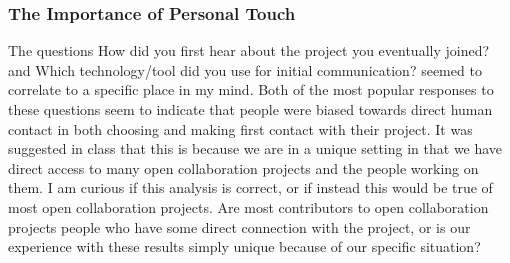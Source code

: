 \subsubsection{The Importance of Personal Touch}
The questions {\bold How did you first hear about the project you eventually joined?} and {\bold Which technology/tool did you use for initial communication?} seemed to correlate to a specific place in my mind.  Both of the most popular responses to these questions seem to indicate that people were biased towards direct human contact in both choosing and making first contact with their project.  It was suggested in class that this is because we are in a unique setting in that we have direct access to many open collaboration projects and the people working on them.  I am curious if this analysis is correct, or if instead this would be true of most open collaboration projects.  Are most contributors to open collaboration projects people who have some direct connection with the project, or is our experience with these results simply unique because of our specific situation?
